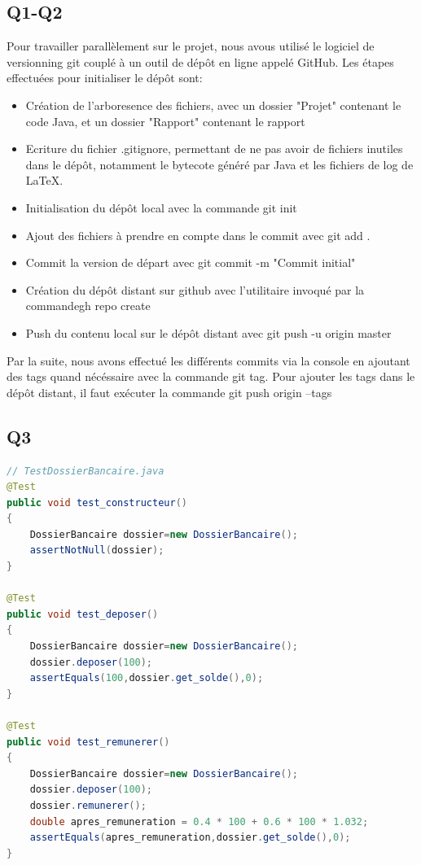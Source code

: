 \documentclass[12pt]{article}
\begin{document}
\subsection{Q1-Q2}

Pour travailler parallèlement sur le projet, nous avous utilisé le logiciel de versionning git couplé à un outil 
de dépôt en ligne appelé GitHub. Les étapes effectuées pour initialiser le dépôt sont:
\begin{itemize}
    \item Création de l'arboresence des fichiers, avec un dossier "Projet" contenant le code Java, et un dossier "Rapport" contenant le rapport
    \item Ecriture du fichier .gitignore, permettant de ne pas avoir de fichiers inutiles dans le dépôt, notamment le bytecote généré par Java et les fichiers de log de \LaTeX.
    \item Initialisation du dépôt local avec la commande \textquotesingle git init\textquotesingle
    \item Ajout des fichiers à prendre en compte dans le commit avec \textquotesingle git add .\textquotesingle 
    \item Commit la version de départ avec \textquotesingle git commit -m "Commit initial"\textquotesingle 
    \item Création du dépôt distant sur github avec l'utilitaire invoqué par la commande\textquotesingle gh repo create\textquotesingle 
    \item Push du contenu local sur le dépôt distant avec \textquotesingle git push -u origin master\textquotesingle 
\end{itemize}

Par la suite, nous avons effectué les différents commits via la console en ajoutant des tags quand 
nécéssaire avec la commande \textquotesingle git tag\textquotesingle .
Pour ajouter les tags dans le dépôt distant, il faut exécuter la commande \textquotesingle git push origin --tags\textquotesingle

\subsection{Q3}

\begin{lstlisting}[language=Java]
// TestDossierBancaire.java
@Test
public void test_constructeur() 
{
	DossierBancaire dossier=new DossierBancaire();
	assertNotNull(dossier);
}

@Test  
public void test_deposer() 
{
	DossierBancaire dossier=new DossierBancaire();
	dossier.deposer(100);
	assertEquals(100,dossier.get_solde(),0); 
}

@Test
public void test_remunerer() 
{
	DossierBancaire dossier=new DossierBancaire();
	dossier.deposer(100);
	dossier.remunerer();
	double apres_remuneration = 0.4 * 100 + 0.6 * 100 * 1.032;
	assertEquals(apres_remuneration,dossier.get_solde(),0);
}
\end{lstlisting}
\end{document}
